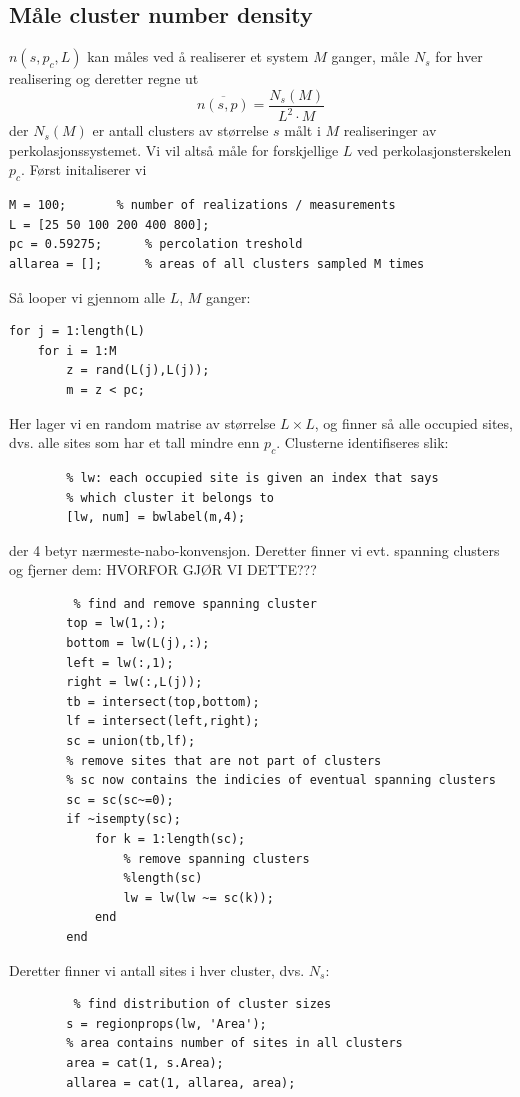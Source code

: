 \documentclass[english, a4paper]{article}
\begin{document}
\subsection{Måle cluster number density}
$n(s, p_c, L)$ kan måles ved å realiserer et system $M$ ganger, måle $N_s$ for hver realisering og
deretter regne ut
\begin{equation}
 \overline{n(s,p)} = \frac{N_s(M)}{L^2 \cdot M}
\end{equation}
der $N_s(M)$ er antall clusters av størrelse $s$ målt i $M$ realiseringer av perkolasjonssystemet. 
Vi vil altså måle for forskjellige $L$ ved perkolasjonsterskelen $p_c$. Først initaliserer vi
\begin{lstlisting}
M = 100;       % number of realizations / measurements
L = [25 50 100 200 400 800];
pc = 0.59275;      % percolation treshold
allarea = [];      % areas of all clusters sampled M times
\end{lstlisting}
Så looper vi gjennom alle $L$, $M$ ganger:
\begin{lstlisting}
for j = 1:length(L)
    for i = 1:M
        z = rand(L(j),L(j));
        m = z < pc;
\end{lstlisting}
Her lager vi en random matrise av størrelse $L \times L$, og finner så alle occupied sites, dvs.
alle sites som har et tall mindre enn $p_c$. 
Clusterne identifiseres slik:
\begin{lstlisting}
        % lw: each occupied site is given an index that says
        % which cluster it belongs to
        [lw, num] = bwlabel(m,4);
\end{lstlisting}
der 4 betyr nærmeste-nabo-konvensjon. 
Deretter finner vi evt. spanning clusters og 
fjerner dem: HVORFOR GJØR VI DETTE???
\begin{lstlisting}
         % find and remove spanning cluster
        top = lw(1,:);
        bottom = lw(L(j),:);
        left = lw(:,1);
        right = lw(:,L(j));
        tb = intersect(top,bottom);
        lf = intersect(left,right);
        sc = union(tb,lf);
        % remove sites that are not part of clusters
        % sc now contains the indicies of eventual spanning clusters
        sc = sc(sc~=0);
        if ~isempty(sc);
            for k = 1:length(sc);
                % remove spanning clusters
                %length(sc)
                lw = lw(lw ~= sc(k));
            end
        end
\end{lstlisting}
Deretter finner vi antall sites i hver cluster, dvs. $N_s$:
\begin{lstlisting}
         % find distribution of cluster sizes
        s = regionprops(lw, 'Area');
        % area contains number of sites in all clusters
        area = cat(1, s.Area);
        allarea = cat(1, allarea, area);
\end{lstlisting}
\end{document}
